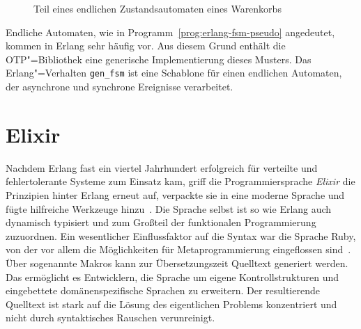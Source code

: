 \begin{figure}[!hbt]%
\caption{Teil eines endlichen Zustandsautomaten eines Warenkorbs}%
\label{fig:fsm-diag}%
\end{figure}

Endliche Automaten, wie in Programm~\ref{prog:erlang-fsm-pseudo} angedeutet, kommen in Erlang sehr häufig vor. Aus diesem Grund enthält die OTP"=Bibliothek eine generische Implementierung dieses Musters. Das Erlang"=Verhalten \lstinline{gen_fsm} ist eine Schablone für einen endlichen Automaten, der asynchrone und synchrone Ereignisse verarbeitet.

\section{Elixir}

Nachdem Erlang fast ein viertel Jahrhundert erfolgreich für verteilte und fehlertolerante Systeme zum Einsatz kam, griff die Programmiersprache \textit{Elixir} die Prinzipien hinter Erlang erneut auf, verpackte sie in eine moderne Sprache und fügte hilfreiche Werkzeuge hinzu~\cite[9-10]{Loder2016}. Die Sprache selbst ist so wie Erlang auch dynamisch typisiert und zum Großteil der funktionalen Programmierung zuzuordnen. Ein wesentlicher Einflussfaktor auf die Syntax war die Sprache Ruby, von der vor allem die Möglichkeiten für Metaprogrammierung eingeflossen sind~\cite{ValimGoto2014}. Über sogenannte Makros kann zur Übersetzungszeit Quelltext generiert werden. Das ermöglicht es Entwicklern, die Sprache um eigene Kontrollstrukturen und eingebettete domänenspezifische Sprachen zu erweitern. Der resultierende Quelltext ist stark auf die Lösung des eigentlichen Problems konzentriert und nicht durch syntaktisches Rauschen verunreinigt.

